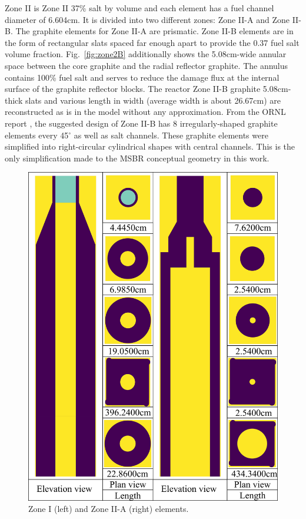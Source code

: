 \documentclass{anstrans}
\begin{document}
Zone II is Zone II 37\% salt by volume and each element has a fuel channel diameter of 
6.604cm. It is divided into two different zones: Zone II-A and Zone II-B. The 
graphite elements for Zone II-A are prismatic. Zone II-B elements are in the 
form of rectangular slats spaced far enough apart to provide the 0.37 fuel salt 
volume fraction. Fig.~\ref{fig:zone2B} additionally shows the 5.08cm-wide 
annular space between the core graphite and the radial reflector graphite. The 
annulus contains 100\% fuel salt and serves to reduce the damage flux at the 
internal surface of the graphite reflector blocks. The reactor Zone II-B 
graphite 5.08cm-thick slats and various length in width (average width is about 
26.67cm) are reconstructed as is in the model without any approximation. From 
the ORNL report \cite{robertson_conceptual_1971}, the suggested design of Zone 
II-B has 8 irregularly-shaped graphite elements every 45$^\circ$ as well as 
salt channels. These graphite elements were simplified into right-circular 
cylindrical shapes with central channels. This is the only simplification made 
to the \gls{MSBR} conceptual geometry in this work.
\FloatBarrier
\begin{figure}[htp!] %
  \centering
  \includegraphics[width=\linewidth]{figure_2_4.png}
  \caption{Zone I (left) and Zone II-A (right) elements.}
  \label{fig:zone12A}
\end{figure}
\end{document}
